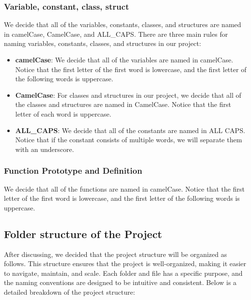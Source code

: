 \subsubsection{Variable, constant, class, struct}
\label{subsubsec:variable-constant-class-struct}

\hspace{1cm} We decide that all of the variables, constants, classes, and structures are named in camelCase, CamelCase, and ALL\_CAPS. There are three main rules for naming variables, constants, classes, and structures in our project:

\begin{itemize}
    \item \textbf{camelCase}: We decide that all of the variables are named in camelCase. Notice that the first letter of the first word is lowercase, and the first letter of the following words is uppercase.
    \item \textbf{CamelCase}: For classes and structures in our project, we decide that all of the classes and structures are named in CamelCase. Notice that the first letter of each word is uppercase.
    \item \textbf{ALL\_CAPS}: We decide that all of the constants are named in ALL CAPS. Notice that if the constant consists of multiple words, we will separate them with an underscore.
\end{itemize}

\subsubsection{Function Prototype and Definition}
\label{subsubsec:function-prototype-definition}

\hspace{1cm} We decide that all of the functions are named in camelCase. Notice that the first letter of the first word is lowercase, and the first letter of the following words is uppercase.

\subsection{Folder structure of the Project}
\label{subsec:folder-structure-of-the-project}

\hspace{1cm} After discussing, we decided that the project structure will be organized as follows. This structure ensures that the project is well-organized, making it easier to navigate, maintain, and scale. Each folder and file has a specific purpose, and the naming conventions are designed to be intuitive and consistent. Below is a detailed breakdown of the project structure:

